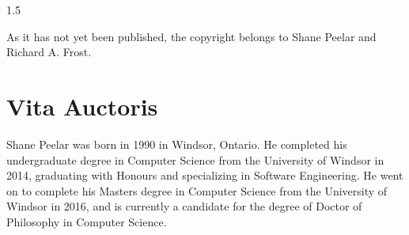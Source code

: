\documentclass[fleqn, oneside, 12pt]{book}
\theoremstyle{definitionsty}
\newcommand{\uwinonehalfspacelen}{1.5}
\newcommand{\uwindefaultspacelen}{\uwinonehalfspacelen}
\newenvironment{uwindefaultspaceenv}%
{\begin{spacing}{\uwindefaultspacelen}}%
	{\end{spacing}}
\begin{document}
\begin{uwindefaultspaceenv}
\begin{enumerate}
{    %

    As it has not yet been published, the copyright belongs to Shane Peelar and Richard A. Frost.

    }
\end{enumerate}








\chapter*{Vita Auctoris}

Shane Peelar was born in 1990 in Windsor, Ontario.  He completed his undergraduate degree in Computer Science from the University of Windsor in 2014, graduating with Honours and specializing in Software Engineering.  He went on to complete his Masters degree in Computer Science from the University of Windsor in 2016, and is currently a candidate for the degree of Doctor of Philosophy in Computer Science.

\end{uwindefaultspaceenv}
\end{document}
